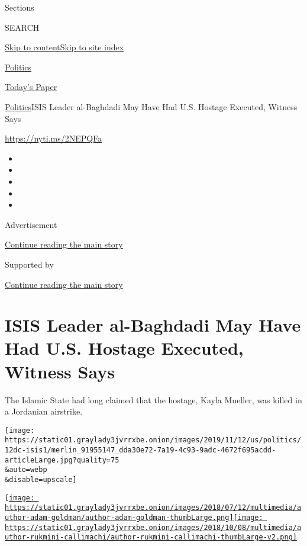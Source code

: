 Sections

SEARCH

\protect\hyperlink{site-content}{Skip to
content}\protect\hyperlink{site-index}{Skip to site index}

\href{https://www.nytimes3xbfgragh.onion/section/politics}{Politics}

\href{https://myaccount.nytimes3xbfgragh.onion/auth/login?response_type=cookie\&client_id=vi}{}

\href{https://www.nytimes3xbfgragh.onion/section/todayspaper}{Today's
Paper}

\href{/section/politics}{Politics}\textbar{}ISIS Leader al-Baghdadi May
Have Had U.S. Hostage Executed, Witness Says

\url{https://nyti.ms/2NEPQFa}

\begin{itemize}
\item
\item
\item
\item
\item
\end{itemize}

Advertisement

\protect\hyperlink{after-top}{Continue reading the main story}

Supported by

\protect\hyperlink{after-sponsor}{Continue reading the main story}

\hypertarget{isis-leader-al-baghdadi-may-have-had-us-hostage-executed-witness-says}{%
\section{ISIS Leader al-Baghdadi May Have Had U.S. Hostage Executed,
Witness
Says}\label{isis-leader-al-baghdadi-may-have-had-us-hostage-executed-witness-says}}

The Islamic State had long claimed that the hostage, Kayla Mueller, was
killed in a Jordanian airstrike.

\texttt{[image: https://static01.graylady3jvrrxbe.onion/images/2019/11/12/us/politics/12dc-isis1/merlin\_91955147\_dda30e72-7a19-4c93-9adc-4672f695acdd-articleLarge.jpg?quality=75\\\&auto=webp\\\&disable=upscale]}

\href{https://www.nytimes3xbfgragh.onion/by/adam-goldman}{\texttt{[image: https://static01.graylady3jvrrxbe.onion/images/2018/07/12/multimedia/author-adam-goldman/author-adam-goldman-thumbLarge.png]}}\href{https://www.nytimes3xbfgragh.onion/by/rukmini-callimachi}{\texttt{[image: https://static01.graylady3jvrrxbe.onion/images/2018/10/08/multimedia/author-rukmini-callimachi/author-rukmini-callimachi-thumbLarge-v2.png]}}

